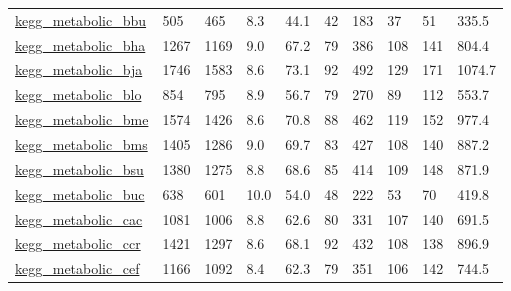 \begin{longtable}{llllllllll}
 \href{http://santafe.edu/~aaronc/data/kegg2006_metabolic.zip}{kegg\_metabolic\_bbu}                                          & 505        & 465   & 8.3    & 44.1   & 42    & 183    & 37     & 51     & 335.5   \\
 \href{http://santafe.edu/~aaronc/data/kegg2006_metabolic.zip}{kegg\_metabolic\_bha}                                          & 1267       & 1169  & 9.0    & 67.2   & 79    & 386    & 108    & 141    & 804.4   \\
 \href{http://santafe.edu/~aaronc/data/kegg2006_metabolic.zip}{kegg\_metabolic\_bja}                                          & 1746       & 1583  & 8.6    & 73.1   & 92    & 492    & 129    & 171    & 1074.7  \\
 \href{http://santafe.edu/~aaronc/data/kegg2006_metabolic.zip}{kegg\_metabolic\_blo}                                          & 854        & 795   & 8.9    & 56.7   & 79    & 270    & 89     & 112    & 553.7   \\
 \href{http://santafe.edu/~aaronc/data/kegg2006_metabolic.zip}{kegg\_metabolic\_bme}                                          & 1574       & 1426  & 8.6    & 70.8   & 88    & 462    & 119    & 152    & 977.4   \\
 \href{http://santafe.edu/~aaronc/data/kegg2006_metabolic.zip}{kegg\_metabolic\_bms}                                          & 1405       & 1286  & 9.0    & 69.7   & 83    & 427    & 108    & 140    & 887.2   \\
 \href{http://santafe.edu/~aaronc/data/kegg2006_metabolic.zip}{kegg\_metabolic\_bsu}                                          & 1380       & 1275  & 8.8    & 68.6   & 85    & 414    & 109    & 148    & 871.9   \\
 \href{http://santafe.edu/~aaronc/data/kegg2006_metabolic.zip}{kegg\_metabolic\_buc}                                          & 638        & 601   & 10.0   & 54.0   & 48    & 222    & 53     & 70     & 419.8   \\
 \href{http://santafe.edu/~aaronc/data/kegg2006_metabolic.zip}{kegg\_metabolic\_cac}                                          & 1081       & 1006  & 8.8    & 62.6   & 80    & 331    & 107    & 140    & 691.5   \\
 \href{http://santafe.edu/~aaronc/data/kegg2006_metabolic.zip}{kegg\_metabolic\_ccr}                                          & 1421       & 1297  & 8.6    & 68.1   & 92    & 432    & 108    & 138    & 896.9   \\
 \href{http://santafe.edu/~aaronc/data/kegg2006_metabolic.zip}{kegg\_metabolic\_cef}                                          & 1166       & 1092  & 8.4    & 62.3   & 79    & 351    & 106    & 142    & 744.5   \\

\end{longtable}
